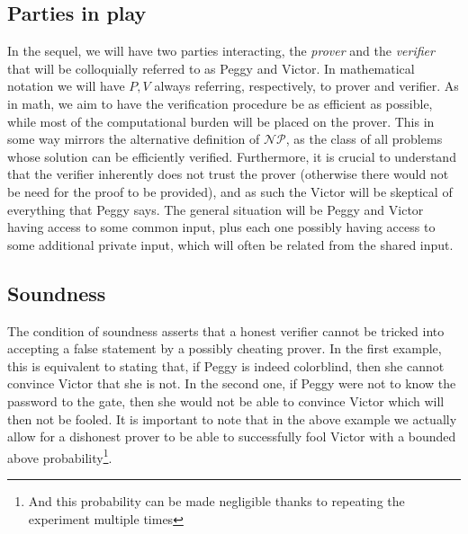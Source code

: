 \documentclass{article}
\begin{document}
\subsection{Parties in play}
In the sequel, we will have two parties interacting, the \textit{prover} and the \textit{verifier} that will be colloquially referred to as Peggy and Victor. In mathematical notation we will have $P, V$ always referring, respectively, to prover and verifier. As in math, we aim to have the verification procedure be as efficient as possible, while most of the computational burden will be placed on the prover. This in some way mirrors the alternative definition of $\mathcal{NP}$, as the class of all problems whose solution can be efficiently verified. Furthermore, it is crucial to understand that the verifier inherently does not trust the prover (otherwise there would not be need for the proof to be provided), and as such the Victor will be skeptical of everything that Peggy says. The general situation will be Peggy and Victor having access to some common input, plus each one possibly having access to some additional private input, which will often be related from the shared input.

\subsection{Soundness}
The condition of soundness asserts that a honest verifier cannot be tricked into accepting a false statement by a possibly cheating prover. In the first example, this is equivalent to stating that, if Peggy is indeed colorblind, then she cannot convince Victor that she is not. In the second one, if Peggy were not to know the password to the gate, then she would not be able to convince Victor which will then not be fooled. It is important to note that in the above example we actually allow for a dishonest prover to be able to successfully fool Victor with a bounded above probability\footnote{And this probability can be made negligible thanks to repeating the experiment multiple times}.
\end{document}
